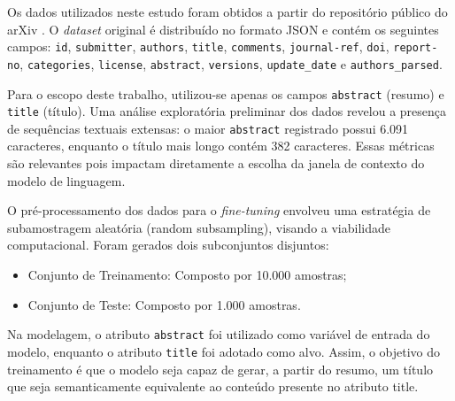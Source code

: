 

Os dados utilizados neste estudo foram obtidos a partir do repositório público do arXiv \cite{arxivorg_submitters_arxiv_nodate}. O \textit{dataset} original é distribuído no formato JSON e contém os seguintes campos: \texttt{id}, \texttt{submitter}, \texttt{authors}, \texttt{title}, \texttt{comments}, \texttt{journal-ref}, \texttt{doi}, \texttt{report-no}, \texttt{categories}, \texttt{license}, \texttt{abstract}, \texttt{versions}, \texttt{update\_date} e \texttt{authors\_parsed}.

Para o escopo deste trabalho, utilizou-se apenas os campos \texttt{abstract} (resumo) e \texttt{title} (título). Uma análise exploratória preliminar dos dados revelou a presença de sequências textuais extensas: o maior \texttt{abstract} registrado possui 6.091 caracteres, enquanto o título mais longo contém 382 caracteres. Essas métricas são relevantes pois impactam diretamente a escolha da janela de contexto do modelo de linguagem.

O pré-processamento dos dados para o \textit{fine-tuning} envolveu uma estratégia de subamostragem aleatória (random subsampling), visando a viabilidade computacional. Foram gerados dois subconjuntos disjuntos: \begin{itemize} \item Conjunto de Treinamento: Composto por 10.000 amostras; \item Conjunto de Teste: Composto por 1.000 amostras. \end{itemize}

Na modelagem, o atributo \texttt{abstract} foi utilizado como variável de entrada do modelo, enquanto o atributo \texttt{title} foi adotado como alvo. Assim, o objetivo do treinamento é que o modelo seja capaz de gerar, a partir do resumo, um título que seja semanticamente equivalente ao conteúdo presente no atributo title.